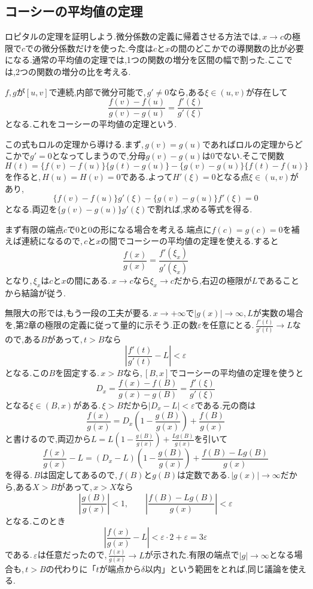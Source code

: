 \subsection{コーシーの平均値の定理}

ロピタルの定理を証明しよう.微分係数の定義に帰着させる方法では,\,$x\to c$の極限で$c$での微分係数だけを使った.今度は$c$と$x$の間のどこかでの導関数の比が必要になる.通常の平均値の定理では,1つの関数の増分を区間の幅で割った.ここでは,2つの関数の増分の比を考える.

$f,g$が$[u,v]$で連続,内部で微分可能で,\,$g'\ne0$なら,ある$\xi\in(u,v)$が存在して
\[
 \frac{f(v)-f(u)}{g(v)-g(u)}=\frac{f'(\xi)}{g'(\xi)}
\]
となる.これをコーシーの平均値の定理という.

この式もロルの定理から導ける.まず,\,$g(v)=g(u)$であればロルの定理からどこかで$g'=0$となってしまうので,分母$g(v)-g(u)$は$0$でない.そこで関数
\[
 H(t)=\{f(v)-f(u)\}\{g(t)-g(u)\}
      -\{g(v)-g(u)\}\{f(t)-f(u)\}
\]
を作ると,\,$H(u)=H(v)=0$である.よって$H'(\xi)=0$となる点$\xi\in(u,v)$があり,
\[
 \{f(v)-f(u)\}g'(\xi)-\{g(v)-g(u)\}f'(\xi)=0
\]
となる.両辺を$\{g(v)-g(u)\}g'(\xi)$で割れば,求める等式を得る.

まず有限の端点$c$で$0$と$0$の形になる場合を考える.端点に$f(c)=g(c)=0$を補えば連続になるので,\,$c$と$x$の間でコーシーの平均値の定理を使える.すると
\[
 \frac{f(x)}{g(x)}=\frac{f'(\xi_x)}{g'(\xi_x)}
\]
となり,\,$\xi_x$は$c$と$x$の間にある.\,$x\to c$なら$\xi_x\to c$だから,右辺の極限が$L$であることから結論が従う.

無限大の形では,もう一段の工夫が要る.\,$x\to+\infty$で$|g(x)|\to\infty$,\,$L$が実数の場合を,第2章の極限の定義に従って量的に示そう.正の数$\varepsilon$を任意にとる.\,$\frac{f'(t)}{g'(t)}\to L$なので,ある$B$があって,\,$t>B$なら
\[
 \left|\frac{f'(t)}{g'(t)}-L\right|<\varepsilon
\]
となる.この$B$を固定する.\,$x>B$なら,\,$[B,x]$でコーシーの平均値の定理を使うと
\[
 D_x=\frac{f(x)-f(B)}{g(x)-g(B)}=\frac{f'(\xi)}{g'(\xi)}
\]
となる$\xi\in(B,x)$がある.\,$\xi>B$だから$|D_x-L|<\varepsilon$である.元の商は
\[
 \frac{f(x)}{g(x)}
 =D_x\left(1-\frac{g(B)}{g(x)}\right)+\frac{f(B)}{g(x)}
\]
と書けるので,両辺から$L=L\left(1-\frac{g(B)}{g(x)}\right)+\frac{Lg(B)}{g(x)}$を引いて
\[
 \frac{f(x)}{g(x)}-L
 =(D_x-L)\left(1-\frac{g(B)}{g(x)}\right)+\frac{f(B)-Lg(B)}{g(x)}
\]
を得る.\,$B$は固定してあるので,\,$f(B)$と$g(B)$は定数である.\,$|g(x)|\to\infty$だから,ある$X>B$があって,\,$x>X$なら
\[
 \left|\frac{g(B)}{g(x)}\right|<1,\qquad
 \left|\frac{f(B)-Lg(B)}{g(x)}\right|<\varepsilon
\]
となる.このとき
\[
 \left|\frac{f(x)}{g(x)}-L\right|
 <\varepsilon\cdot2+\varepsilon=3\varepsilon
\]
である.\,$\varepsilon$は任意だったので,\,$\frac{f(x)}{g(x)}\to L$が示された.有限の端点で$|g|\to\infty$となる場合も,\,$t>B$の代わりに「$t$が端点から$\delta$以内」という範囲をとれば,同じ議論を使える.

